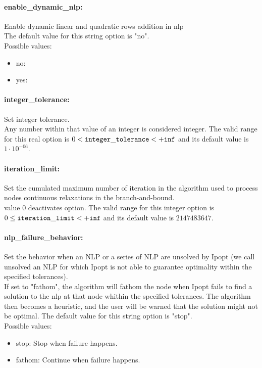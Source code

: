 \paragraph{\bf enable\_dynamic\_nlp:}\label{sec:enable_dynamic_nlp} Enable dynamic linear and quadratic rows addition in nlp $\;$ \\

The default value for this string option is "no".
\\ 
Possible values:
\begin{itemize}
   \item no: 
   \item yes: 
\end{itemize}

\paragraph{\bf integer\_tolerance:}\label{sec:integer_tolerance} Set integer tolerance. $\;$ \\
 Any number within that value of an integer is
considered integer. The valid range for this real option is 
$0 <  {\tt integer\_tolerance } <  {\tt +inf}$
and its default value is $1 \cdot 10^{-06}$.


\paragraph{\bf iteration\_limit:}\label{sec:iteration_limit} Set the cumulated maximum number of iteration in the algorithm used to process nodes continuous relaxations in the branch-and-bound. $\;$ \\
 value 0 deactivates option. The valid range for this integer option is
$0 \le {\tt iteration\_limit } <  {\tt +inf}$
and its default value is $2147483647$.


\paragraph{\bf nlp\_failure\_behavior:}\label{sec:nlp_failure_behavior} Set the behavior when an NLP or a series of NLP are unsolved by Ipopt (we call unsolved an NLP for which Ipopt is not able to guarantee optimality within the specified tolerances). $\;$ \\
 If set to "fathom", the algorithm will fathom the
node when Ipopt fails to find a solution to the
nlp at that node whithin the specified
tolerances. The algorithm then becomes a
heuristic, and the user will be warned that the
solution might not be optimal.
The default value for this string option is "stop".
\\ 
Possible values:
\begin{itemize}
   \item stop: Stop when failure happens.
   \item fathom: Continue when failure happens.
\end{itemize}

